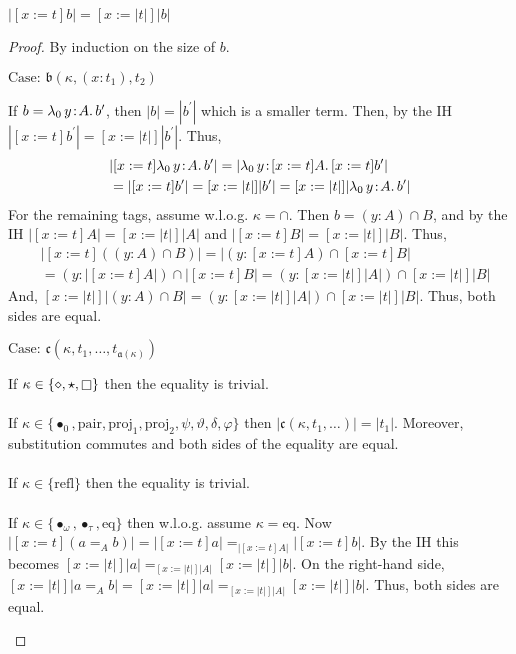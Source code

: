 \begin{lemma}
    \label{lem:2:erase_subst}
    $|[x := t]b| = [x := |t|]|b|$
\end{lemma}
\begin{proof}
    By induction on the size of $b$.

    $\text{Case: }\mathfrak{b}(\kappa, (x : t_1), t_2)$
    \begin{proofcase}
        If $b = {\lambda_0}\, y\! : \! A.\, b^\prime$, then $|b| = |b^\prime|$ which is a smaller term.
        Then, by the IH $|[x := t]b^\prime| = [x := |t|]|b^\prime|$.
        Thus,
        \begin{align*}
            &|[x := t]{\lambda_0}\, y\! : \! A.\, b^\prime| = |{\lambda_0}\, y\! : \! [x := t]A.\, [x := t]b^\prime| \\
            &= |[x := t]b^\prime| = [x := |t|]|b^\prime| = [x := |t|]|{\lambda_0}\, y\! : \! A.\, b^\prime|
        \end{align*}
        For the remaining tags, assume w.l.o.g. $\kappa = \cap$.
        Then $b = (y : A) \cap B$, and by the IH $|[x := t]A| = [x := |t|]|A|$ and $|[x := t]B| = [x := |t|]|B|$.
        Thus,
        \begin{align*}
            &|[x := t]((y : A) \cap B)| = |(y : [x := t]A) \cap [x := t]B| \\
            &= (y : |[x := t]A|) \cap |[x := t]B| = (y : [x := |t|]|A|) \cap [x := |t|]|B|
        \end{align*}
        And, $[x := |t|]|(y : A) \cap B| = (y : [x := |t|]|A|) \cap [x := |t|]|B|$.
        Thus, both sides are equal.
    \end{proofcase}

    $\text{Case: }\mathfrak{c}(\kappa, t_1, \ldots, t_{\mathfrak{a}(\kappa)})$
    \begin{proofcase}
        If $\kappa \in \{ \diamond, \star, \kind \}$ then the equality is trivial.
        \\ \\
        If $\kappa \in \{ \bullet_0, \text{pair}, \text{proj}_1, \text{proj}_2, \psi, \vartheta, \delta, \varphi \}$ then $|\mathfrak{c}(\kappa, t_1, \ldots)| = |t_1|$.
        Moreover, substitution commutes and both sides of the equality are equal.
        \\ \\
        If $\kappa \in \{ \text{refl} \}$ then the equality is trivial.
        \\ \\
        If $\kappa \in \{ \bullet_\omega, \bullet_\tau, \text{eq} \}$ then w.l.o.g. assume $\kappa = \text{eq}$.
        Now $|[x := t](a =_A b)| = |[x := t]a| =_{|[x := t]A|} |[x := t]b|$.
        By the IH this becomes $[x := |t|]|a| =_{[x := |t|]|A|} [x := |t|]|b|$.
        On the right-hand side, $[x := |t|]|a =_A b| = [x := |t|]|a| =_{[x := |t|]|A|} [x := |t|]|b|$.
        Thus, both sides are equal.
    \end{proofcase}


\end{proof}
